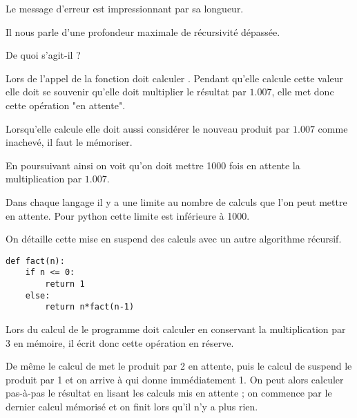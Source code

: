 Le message d'erreur est impressionnant par sa longueur.

Il nous parle d'une profondeur maximale de récursivité dépassée.

De quoi s'agit-il ?

Lors de l'appel de  la fonction doit calculer . Pendant qu'elle calcule cette valeur
elle doit se souvenir qu'elle doit multiplier le résultat par $1.007$, elle met donc cette opération "en attente".

Lorsqu'elle calcule  elle doit aussi considérer le nouveau produit par $1.007$ comme inachevé, il faut le mémoriser.

En poursuivant ainsi on voit qu'on doit mettre 1000 fois en attente la multiplication par $1.007$.

Dans chaque langage il y a une limite au nombre de calculs que l'on peut mettre en attente. Pour python cette limite est inférieure à 1000.

\medskip

On détaille cette mise en suspend des calculs avec un autre algorithme récursif.
\begin{lstlisting}
def fact(n):
    if n <= 0:
        return 1
    else:
        return n*fact(n-1)
\end{lstlisting}

Lors du calcul de  le programme doit calculer  en conservant la multiplication par 3 en mémoire, il écrit donc cette opération en réserve.

De même le calcul de  met le produit par 2 en attente, puis le calcul de  suspend le produit par 1  et on arrive à  qui donne immédiatement 1. On peut alors calculer pas-à-pas le résultat en lisant les calculs mis en attente ; on commence par le dernier calcul mémorisé et on finit lors qu'il n'y a plus rien.
\begin{center}
\end{center}
